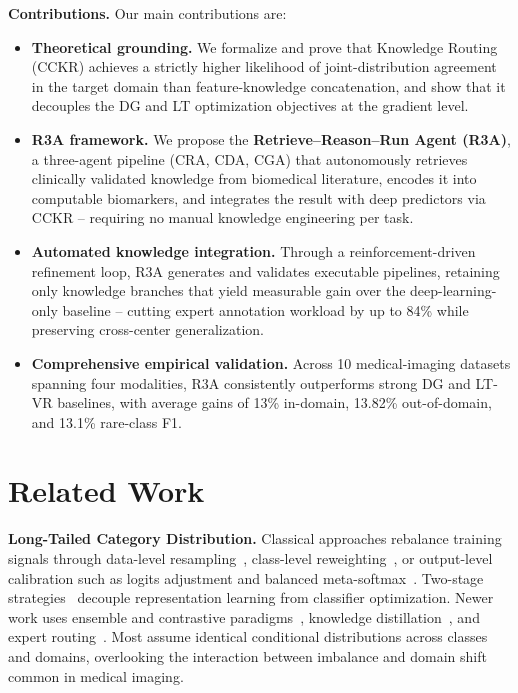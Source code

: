 \documentclass{article}
\begin{document}
\textbf{Contributions.} Our main contributions are:
\begin{itemize}\itemsep2pt \parskip0pt 

  \item \textbf{Theoretical grounding.}
  We formalize and prove that Knowledge Routing (CCKR)
  achieves a strictly higher likelihood of joint-distribution
  agreement in the target domain than feature-knowledge
  concatenation, and show that it decouples the DG and LT
  optimization objectives at the gradient level.

  \item \textbf{R3A framework.}
  We propose the \textbf{Retrieve--Reason--Run Agent (R3A)},
  a three-agent pipeline (CRA, CDA, CGA) that autonomously
  retrieves clinically validated knowledge from biomedical
  literature, encodes it into computable biomarkers, and
  integrates the result with deep predictors via CCKR --
  requiring no manual knowledge engineering per task.

  \item \textbf{Automated knowledge integration.}
  Through a reinforcement-driven refinement loop, R3A
  generates and validates executable pipelines, retaining
  only knowledge branches that yield measurable gain over
  the deep-learning-only baseline -- cutting expert
  annotation workload by up to 84\% while preserving
  cross-center generalization.

  \item \textbf{Comprehensive empirical validation.}
  Across 10 medical-imaging datasets spanning four modalities,
  R3A consistently outperforms strong DG and LT-VR baselines,
  with average gains of 13\% in-domain, 13.82\%
  out-of-domain, and 13.1\% rare-class F1.

\end{itemize}

\section{Related Work}
\label{sec:relWorks}

\textbf{Long-Tailed Category Distribution.}
Classical approaches rebalance training signals through data-level
resampling~\cite{Han05, Buda18}, class-level
reweighting~\cite{Huang16, Wang17}, or output-level calibration such as
logits adjustment and balanced meta-softmax~\cite{Hong21, Ren20}. Two-stage
strategies~\cite{Kang19, Tang20} decouple representation learning from
classifier optimization. Newer work uses ensemble and contrastive
paradigms~\cite{Wang21contrast}, knowledge distillation~\cite{Iscen21}, and
expert routing~\cite{Wang21routing}. Most assume identical conditional
distributions across classes and domains, overlooking the interaction between
imbalance and domain shift common in medical imaging. 
\end{document}
